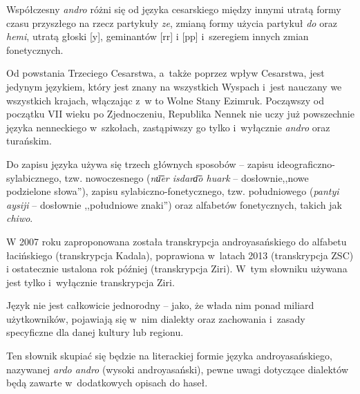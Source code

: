 \begin{spacing}{1.1}
Współczesny \emph{andro} różni się od języka cesarskiego między innymi utratą
formy czasu przyszłego na rzecz partykuły \emph{ze}, zmianą formy użycia
partykuł \emph{do} oraz \emph{hemi}, utratą głoski [y], geminantów [rr] i [pp]
i~szeregiem innych zmian fonetycznych.

Od powstania Trzeciego Cesarstwa, a~także poprzez wpływ Cesarstwa, jest jedynym
językiem, który jest znany na wszystkich Wyspach i~jest nauczany we wszystkich
krajach, włączając z~w to Wolne Stany Ezimruk. Począwszy od początku VII wieku
po Zjednoczeniu, Republika Nennek nie uczy już powszechnie języka nenneckiego
w~szkołach, zastąpiwszy go tylko i~wyłącznie \emph{andro} oraz turańskim.

Do zapisu języka używa się trzech głównych sposobów -- zapisu
ideograficzno-sylabicznego, tzw. nowoczesnego (\emph{nu͞er isdara͞o huark} --
dosłownie,,nowe podzielone słowa''), zapisu sylabiczno-fonetycznego, tzw.
południowego (\emph{pantyi aysiji} -- dosłownie ,,południowe znaki'') oraz
alfabetów fonetycznych, takich jak \emph{chiwo}.

W 2007 roku zaproponowana została transkrypcja androyasańskiego do alfabetu 
łacińskiego (transkrypcja Kadala), poprawiona w~latach 2013 (transkrypcja 
ZSC) i ostatecznie ustalona rok później (transkrypcja Ziri). W~tym słowniku
używana jest tylko i~wyłącznie transkrypcja Ziri.

Język nie jest całkowicie jednorodny -- jako, że włada nim ponad miliard 
użytkowników, pojawiają się w~nim dialekty oraz zachowania i~zasady specyficzne 
dla danej kultury lub regionu. 

Ten słownik skupiać się będzie na literackiej formie języka androyasańskiego,
nazywanej \emph{ardo andro} (wysoki androyasański), pewne uwagi dotyczące
dialektów będą zawarte w~dodatkowych opisach do haseł.

\end{spacing}